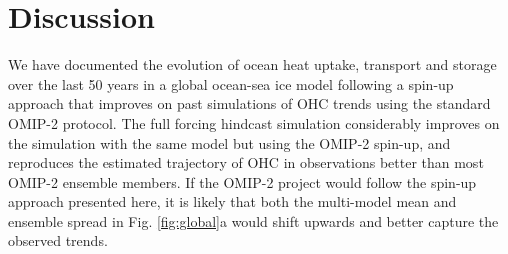\documentclass{nature}
\begin{document}
	
	
	
	\section*{Discussion}
	We have documented the evolution of ocean heat uptake, transport and storage over the last 50 years in a global ocean-sea ice model following a spin-up approach that improves on past simulations of OHC trends using the standard OMIP-2 protocol. The full forcing hindcast simulation considerably improves on the simulation with the same model but using the OMIP-2 spin-up, and reproduces the estimated trajectory of OHC in observations better than most OMIP-2 ensemble members. If the OMIP-2 project would follow the spin-up approach presented here, it is likely that both the multi-model mean and ensemble spread in Fig. \ref{fig:global}a would shift upwards and better capture the observed trends. 
	
\end{document}
